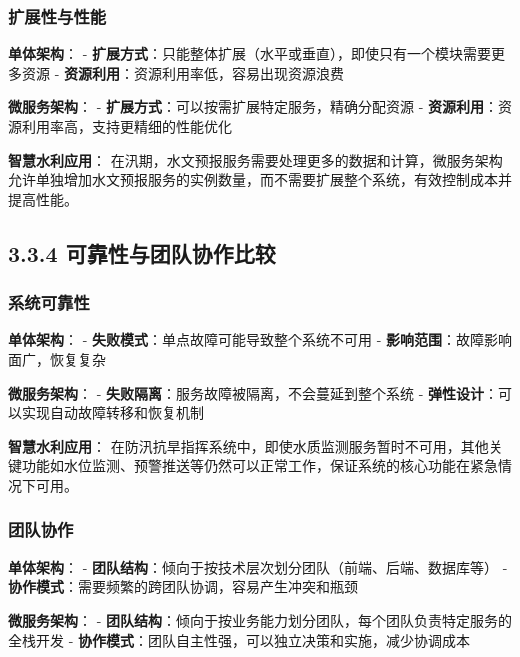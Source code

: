 \subsubsection{扩展性与性能}\label{ux6269ux5c55ux6027ux4e0eux6027ux80fd}

\textbf{单体架构}： -
\textbf{扩展方式}：只能整体扩展（水平或垂直），即使只有一个模块需要更多资源
- \textbf{资源利用}：资源利用率低，容易出现资源浪费

\textbf{微服务架构}： -
\textbf{扩展方式}：可以按需扩展特定服务，精确分配资源 -
\textbf{资源利用}：资源利用率高，支持更精细的性能优化

\textbf{智慧水利应用}：
在汛期，水文预报服务需要处理更多的数据和计算，微服务架构允许单独增加水文预报服务的实例数量，而不需要扩展整个系统，有效控制成本并提高性能。

\subsection{3.3.4
可靠性与团队协作比较}\label{ux53efux9760ux6027ux4e0eux56e2ux961fux534fux4f5cux6bd4ux8f83}

\subsubsection{系统可靠性}\label{ux7cfbux7edfux53efux9760ux6027}

\textbf{单体架构}： - \textbf{失败模式}：单点故障可能导致整个系统不可用
- \textbf{影响范围}：故障影响面广，恢复复杂

\textbf{微服务架构}： -
\textbf{失败隔离}：服务故障被隔离，不会蔓延到整个系统 -
\textbf{弹性设计}：可以实现自动故障转移和恢复机制

\textbf{智慧水利应用}：
在防汛抗旱指挥系统中，即使水质监测服务暂时不可用，其他关键功能如水位监测、预警推送等仍然可以正常工作，保证系统的核心功能在紧急情况下可用。

\subsubsection{团队协作}\label{ux56e2ux961fux534fux4f5c}

\textbf{单体架构}： -
\textbf{团队结构}：倾向于按技术层次划分团队（前端、后端、数据库等） -
\textbf{协作模式}：需要频繁的跨团队协调，容易产生冲突和瓶颈

\textbf{微服务架构}： -
\textbf{团队结构}：倾向于按业务能力划分团队，每个团队负责特定服务的全栈开发
- \textbf{协作模式}：团队自主性强，可以独立决策和实施，减少协调成本

